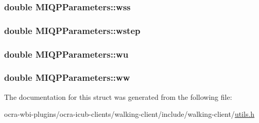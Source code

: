 \hypertarget{structMIQPParameters_a317395e51ff98506316b9a63cf03d48f}{
\subsubsection[{wss}]{\setlength{\rightskip}{0pt plus 5cm}double {\bf \-M\-I\-Q\-P\-Parameters\-::wss}}}\label{structMIQPParameters_a317395e51ff98506316b9a63cf03d48f}
\hypertarget{structMIQPParameters_a284df9b565513a826e92098f0a23f5cc}{
\subsubsection[{wstep}]{\setlength{\rightskip}{0pt plus 5cm}double {\bf \-M\-I\-Q\-P\-Parameters\-::wstep}}}\label{structMIQPParameters_a284df9b565513a826e92098f0a23f5cc}
\hypertarget{structMIQPParameters_aed141afdcc25904d53526a5f2c977427}{
\subsubsection[{wu}]{\setlength{\rightskip}{0pt plus 5cm}double {\bf \-M\-I\-Q\-P\-Parameters\-::wu}}}\label{structMIQPParameters_aed141afdcc25904d53526a5f2c977427}
\hypertarget{structMIQPParameters_a7223a1cda1e4565d18729f1e7bba87e0}{
\subsubsection[{ww}]{\setlength{\rightskip}{0pt plus 5cm}double {\bf \-M\-I\-Q\-P\-Parameters\-::ww}}}\label{structMIQPParameters_a7223a1cda1e4565d18729f1e7bba87e0}


\-The documentation for this struct was generated from the following file\-:\begin{DoxyCompactItemize}
\item 
ocra-\/wbi-\/plugins/ocra-\/icub-\/clients/walking-\/client/include/walking-\/client/\hyperlink{utils_8h}{utils.\-h}\end{DoxyCompactItemize}
